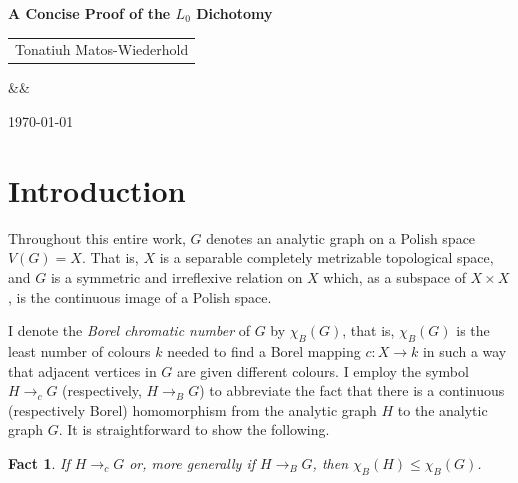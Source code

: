 \documentclass[11pt]{article}
\newcommand{\makeboxedtitle}[4]{
    \begin{center}
        \begin{mdframed}[
            linecolor=black,
            linewidth=1pt,
            roundcorner=0pt,
            innertopmargin=15pt,
            innerbottommargin=15pt,
            backgroundcolor=gray!5
        ]
            \centering
            {\LARGE \bfseries #1 \par} 
            \vspace{12pt}
            {\large 
              \begin{tabular}{c} 
                #2 
              \end{tabular}\par} 
            \ifx&#3&\else \vspace{8pt} {\small \texttt{#3} \par} \fi
            \vspace{5pt}
            {\small \today}
        \end{mdframed}
        \vspace{10pt}
        \begin{abstract}
            #4
        \end{abstract}
    \end{center}
    \vspace{15pt}
}
\theoremstyle{plain}
\newtheorem{fact}[theorem]{Fact}
\theoremstyle{definition}
\theoremstyle{remark}
\begin{document}
\makeboxedtitle{A Concise Proof of the $L_0$ Dichotomy}{
    Tonatiuh Matos-Wiederhold
}{}{
    Carroy, Miller, Schrittesser, and Vidny\'anszky established the $L_0$ dichotomy: there is a Borel graph of Borel chromatic number three that admits a continuous homomorphism to every analytic graph of Borel chromatic number at least three. Their proof relies on a transfinite analysis of terminal approximations over a decreasing $\omega_1$-sequence of analytic sets.

    I give a new, substantially shorter proof of this result by adapting the graph-theoretic framework recently introduced by Bernshteyn for the $G_0$ dichotomy. The central device is a $\sigma$-ideal of \emph{small} sets of homomorphisms from finite path approximations into the target graph, where smallness is witnessed by a bounded odd-walk condition on vertex projections. The key lemma that largeness is preserved under the doubling operation is established via the First Reflection Theorem, replacing the original transfinite construction with a single Borel reflection argument. The continuous homomorphism from the canonical graph $\mathbb L_c$ into the target is then obtained as a limit of shrinking families of copies, in direct analogy with Bernshteyn's proof for $G_0$.
}

\section{Introduction}\label{sec:concise-intro}

Throughout this entire work, $G$ denotes an analytic graph on a Polish space $V(G)=X$.
That is, $X$ is a separable completely metrizable topological space, and $G$ is a symmetric and irreflexive relation on $X$ which, as a subspace of $X\times X$, is the continuous image of a Polish space.

I denote the \emph{Borel chromatic number} of $G$ by $\chi_B(G)$, that is, $\chi_B(G)$ is the least number of colours $k$ needed to find a Borel mapping $c\colon X\to k$ in such a way that adjacent vertices in $G$ are given different colours.
I employ the symbol $H\to_cG$ (respectively, $H\to_BG$) to abbreviate the fact that there is a continuous (respectively Borel) homomorphism from the analytic graph $H$ to the analytic graph $G$.
It is straightforward to show the following.

\begin{fact}\label{fact:chrom_transitive}
    If $H\to_cG$ or, more generally if $H\to_BG$, then $\chi_B(H)\leq\chi_B(G)$.
\end{fact}
\end{document}
